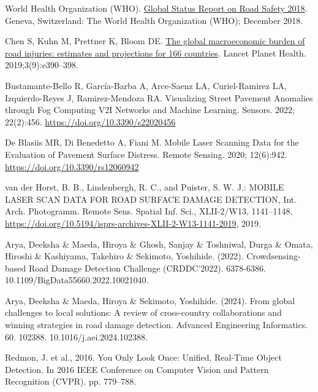 
\begin{thebibliography}{10}

        World Health Organization (WHO). \href{https://www.who.int/publications/i/item/9789241565684}{Global Status Report on Road Safety 2018}. Geneva, Switzerland: The World Health Organization (WHO); December 2018.
    
        Chen S, Kuhn M, Prettner K, Bloom DE. \href{https://www.sciencedirect.com/science/article/pii/S2542519619301706}{The global macroeconomic burden of road injuries: estimates and projections for 166 countries}. Lancet Planet Health. 2019;3(9):e390–398.

        Bustamante-Bello R, García-Barba A, Arce-Saenz LA, Curiel-Ramirez LA, Izquierdo-Reyes J, Ramirez-Mendoza RA. Visualizing Street Pavement Anomalies through Fog Computing V2I Networks and Machine Learning. Sensors. 2022; 22(2):456. \url{https://doi.org/10.3390/s22020456}

        De Blasiis MR, Di Benedetto A, Fiani M. Mobile Laser Scanning Data for the Evaluation of Pavement Surface Distress. Remote Sensing. 2020; 12(6):942. \url{https://doi.org/10.3390/rs12060942}

        van der Horst, B. B., Lindenbergh, R. C., and Puister, S. W. J.: MOBILE LASER SCAN DATA FOR ROAD SURFACE DAMAGE DETECTION, Int. Arch. Photogramm. Remote Sens. Spatial Inf. Sci., XLII-2/W13, 1141–1148, \url{https://doi.org/10.5194/isprs-archives-XLII-2-W13-1141-2019}, 2019.

        Arya, Deeksha \& Maeda, Hiroya \& Ghosh, Sanjay \& Toshniwal, Durga \& Omata, Hiroshi \& Kashiyama, Takehiro \& Sekimoto, Yoshihide. (2022). Crowdsensing-based Road Damage Detection Challenge (CRDDC’2022). 6378-6386. 10.1109/BigData55660.2022.10021040.

        Arya, Deeksha \& Maeda, Hiroya \& Sekimoto, Yoshihide. (2024). From global challenges to local solutions: A review of cross-country collaborations and winning strategies in road damage detection. Advanced Engineering Informatics. 60. 102388. 10.1016/j.aei.2024.102388. 

        Redmon, J. et al., 2016. You Only Look Once: Unified, Real-Time Object Detection. In 2016 IEEE Conference on Computer Vision and Pattern Recognition (CVPR). pp. 779–788.


\end{thebibliography}
